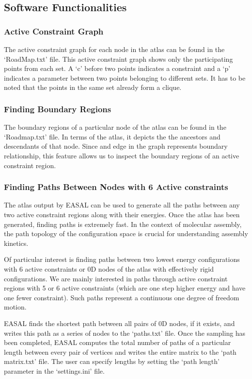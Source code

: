\documentclass[10pt]{article}
\begin{document}
\subsection{Software Functionalities}
\label{sec:part1functionalities}
\subsubsection{Active Constraint Graph} 
The active constraint graph for each node in the atlas can be found in the `RoadMap.txt' file. This active
constraint graph shows only the participating points from each set. A `c' before two points indicates a
constraint and a `p' indicates a parameter between two points belonging to different sets. It has to be noted
that the points in the same set already form a clique.

\subsubsection{Finding Boundary Regions} 
The boundary regions of a particular node of the atlas can be found in the `Roadmap.txt' file. In terms of
the atlas, it depicts the the ancestors and descendants of that node. Since and edge in the graph represents
boundary relationship, this feature allows us to inspect the boundary regions of an active constraint region.


\subsubsection{Finding Paths Between Nodes with 6 Active constraints}
The atlas output by EASAL can be used to generate all the paths between any two active constraint regions
along with their energies. Once the atlas has been generated, finding paths is extremely fast. In the context
of molecular assembly, the path topology of the configuration space is crucial for understanding assembly
kinetics.

Of particular interest is finding paths between two lowest energy configurations with 6 active constraints
or 0D nodes of the atlas with effectively rigid configurations. We are mainly interested in paths through
active constraint regions with 5 or 6 active constraints (which are one step higher energy and have one fewer
constraint). Such paths represent a continuous one degree of freedom motion.

EASAL finds the shortest path between all pairs of 0D nodes, if it exists, and writes this path as a series of nodes
to the `paths.txt' file. Once the sampling has been completed, EASAL computes the total number of paths
of a particular length between every pair of vertices and writes the entire matrix to the `path matrix.txt'
file. The user can specify lengths by setting the `path length' parameter in the `settings.ini' file.
\end{document}
